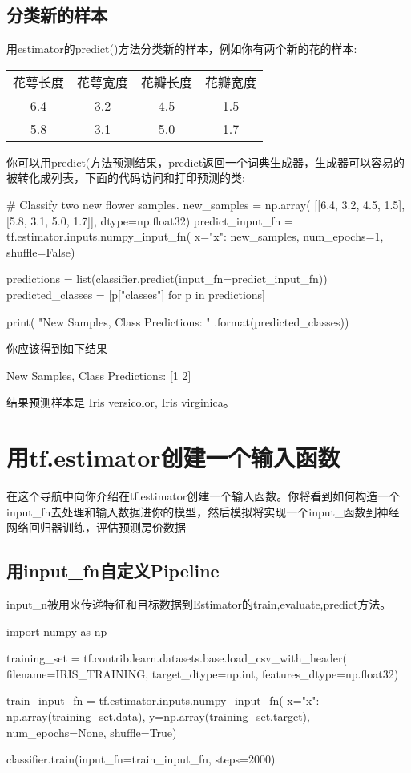 \subsection{分类新的样本}
用estimator的predict()方法分类新的样本，例如你有两个新的花的样本:
\begin{tabular}{|c|c|c|c|}
花萼长度&花萼宽度&花瓣长度&花瓣宽度\\
6.4&3.2&4.5&1.5\\
5.8&3.1&5.0&1.7\\
\end{tabular}
你可以用predict(方法预测结果，predict返回一个词典生成器，生成器可以容易的被转化成列表，下面的代码访问和打印预测的类:
\begin{python}
# Classify two new flower samples.
new_samples = np.array(
    [[6.4, 3.2, 4.5, 1.5],
     [5.8, 3.1, 5.0, 1.7]], dtype=np.float32)
predict_input_fn = tf.estimator.inputs.numpy_input_fn(
    x={"x": new_samples},
    num_epochs=1,
    shuffle=False)

predictions = list(classifier.predict(input_fn=predict_input_fn))
predicted_classes = [p["classes"] for p in predictions]

print(
    "New Samples, Class Predictions:    {}\n"
    .format(predicted_classes))
\end{python}
你应该得到如下结果
\begin{python}
New Samples, Class Predictions:    [1 2]
\end{python}
结果预测样本是 Iris versicolor, Iris virginica。
\section{用tf.estimator创建一个输入函数}
在这个导航中向你介绍在tf.estimator创建一个输入函数。你将看到如何构造一个input\_fn去处理和输入数据进你的模型，然后模拟将实现一个input\_函数到神经网络回归器训练，评估预测房价数据
\subsection{用input\_fn自定义Pipeline}
input\_n被用来传递特征和目标数据到Estimator的train,evaluate,predict方法。
\begin{python}
import numpy as np

training_set = tf.contrib.learn.datasets.base.load_csv_with_header(
    filename=IRIS_TRAINING, target_dtype=np.int, features_dtype=np.float32)

train_input_fn = tf.estimator.inputs.numpy_input_fn(
    x={"x": np.array(training_set.data)},
    y=np.array(training_set.target),
    num_epochs=None,
    shuffle=True)

classifier.train(input_fn=train_input_fn, steps=2000)
\end{python}
